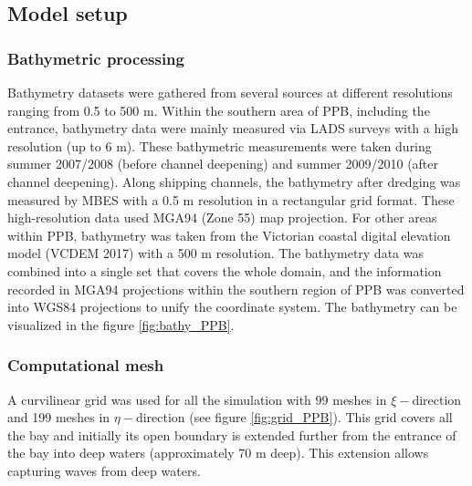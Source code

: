 \documentclass[12pt]{article}
\begin{document}
\subsection{Model setup} \label{sec:model_setup}

\subsubsection{Bathymetric processing}

Bathymetry datasets were gathered from several sources at different resolutions ranging from 0.5 to 500 m. Within the southern area of PPB, including the entrance, bathymetry data were mainly measured via LADS surveys with a high resolution (up to 6 m). These bathymetric measurements were taken during summer 2007/2008 (before channel deepening) and summer 2009/2010 (after channel deepening). Along shipping channels, the bathymetry after dredging was measured by MBES with a 0.5 m resolution in a rectangular grid format. These high-resolution data used MGA94 (Zone 55) map projection. For other areas within PPB, bathymetry was taken from the Victorian coastal digital elevation model (VCDEM 2017) with a 500 m resolution. The bathymetry data was combined into a single set that covers the whole domain, and the information recorded in MGA94 projections within the southern region of PPB was converted into WGS84 projections to unify the coordinate system. The bathymetry can be visualized in the figure \ref{fig:bathy_PPB}.

\subsubsection{Computational mesh}

A curvilinear grid was used for all the simulation with 99 meshes in $\xi-$direction and 199 meshes in $\eta-$direction (see figure \ref{fig:grid_PPB}). This grid covers all the bay and initially its open boundary is extended further from the entrance of the bay into deep waters (approximately 70 m deep). This extension allows capturing waves from deep waters.
\end{document}
